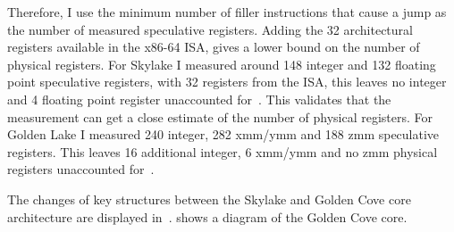 Therefore, I use the minimum number of filler instructions that cause a jump as the number of measured speculative registers.
Adding the 32 architectural registers available in the x86-64 ISA, gives a lower bound on the number of physical registers.
For Skylake I measured around 148 integer and 132 floating point speculative registers, with 32 registers from the ISA, this leaves no integer and 4 floating point register unaccounted for~\cite{Intel_2017_Skylake_SP}.
This validates that the measurement can get a close estimate of the number of physical registers.
For Golden Lake I measured 240 integer, 282 xmm/ymm and 188 zmm speculative registers.
This leaves 16 additional integer, 6 xmm/ymm and no zmm physical registers unaccounted for~\cite{ServerTheHome_2023_SPR_Press,Wccftech_2023_SPR_Press}.

The changes of key structures between the Skylake and Golden Cove core architecture are displayed in~.
 shows a diagram of the Golden Cove core.

